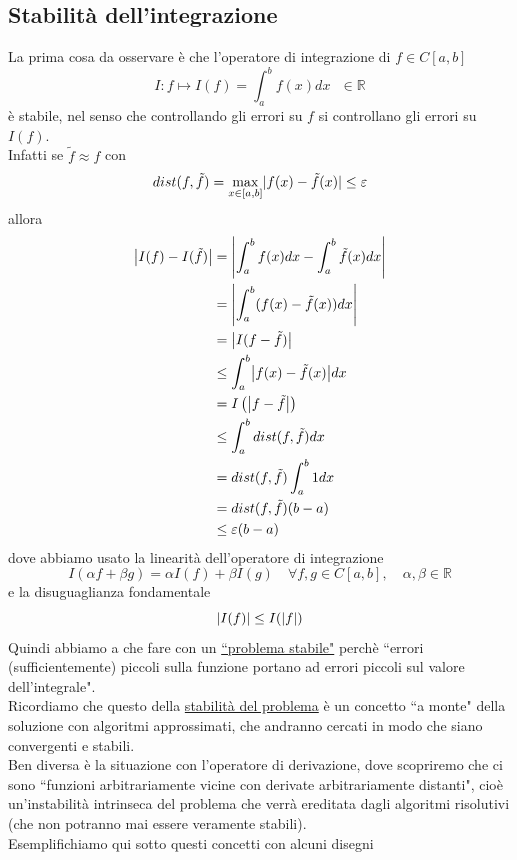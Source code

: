 \documentclass[12pt,a4paper]{article}
\DeclarePairedDelimiter{\abs}{\lvert}{\rvert}
\begin{document}
\subsection{Stabilità dell'integrazione}
La prima cosa da osservare è che l'operatore di integrazione di $f\in C[a,b]$
\begin{equation*}
    I:f\longmapsto I(f)=\int_a^bf(x) dx\  \  \  \in\mathbb{R}
\end{equation*}
è stabile, nel senso che controllando gli errori su $f$ si controllano gli errori su $I(f)$.\\ Infatti se $\tilde{f}\approx f$ con 
\begin{equation*}
dist(f,\tilde{f})= \max_{x\in[a,b]}\abs{f(x)-\tilde{f}(x)}\leq\varepsilon
\end{equation*}
allora
\begin{equation*}
\begin{split}
        \abs*{I(f)-I(\tilde{f})} & = \abs*{\int_a^b f(x)dx-\int_a^b \tilde{f}(x)dx} \\
        & = \abs*{\int_a^b(f(x)-\tilde{f}(x))dx} \\
        & = \abs*{I(f-\tilde{f})} \\
        & \leq \int_a^b \abs*{f(x)-\tilde{f}(x)}dx \\
        & = I\left(\abs*{f-\tilde{f}}\right) \\
        & \leq \int_a^b dist(f,\tilde{f})dx \\
        & = dist(f, \tilde{f})\int_a^b 1 dx \\
        & = dist(f, \tilde{f})(b-a)\\
        & \leq\varepsilon(b-a)
\end{split}
\end{equation*}
dove abbiamo usato la linearità dell'operatore di integrazione
\begin{equation*}
        I(\alpha f+\beta g)=\alpha I(f)+\beta I(g)\quad \forall f,g\in C[a,b],\quad \alpha,\beta\in\mathbb{R}
\end{equation*}
e la disuguaglianza fondamentale
\begin{equation*}
    \abs*{I(f)} \leq I(\abs*{f})
\end{equation*}
Quindi abbiamo a che fare con un \uline{``problema stabile"} perchè ``errori (sufficientemente) piccoli sulla funzione portano ad errori piccoli sul valore dell'integrale".\\
Ricordiamo che questo della \uline{stabilità del problema} è un concetto ``a monte" della soluzione con algoritmi approssimati, che andranno cercati in modo che siano convergenti e stabili. \\Ben diversa è la situazione con l'operatore di derivazione, dove scopriremo che ci sono ``funzioni arbitrariamente vicine con derivate arbitrariamente distanti", cioè un'instabilità intrinseca del problema che verrà ereditata dagli algoritmi risolutivi (che non potranno mai essere veramente stabili).\\ Esemplifichiamo  qui sotto questi concetti con alcuni disegni 
\end{document}
